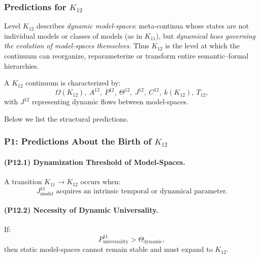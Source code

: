 

\subsubsection{Predictions for $K_{12}$}
\label{sec:predictions-k12}

Level $K_{12}$ describes \emph{dynamic model-spaces}: 
meta-continua whose states are not individual models 
or classes of models (as in $K_{11}$), 
but \emph{dynamical laws governing the evolution of model-spaces themselves}.  
Thus $K_{12}$ is the level at which the continuum 
can reorganize, reparameterize or transform 
entire semantic–formal hierarchies.

A $K_{12}$ continuum is characterized by:
\[
\Omega(K_{12}),\ 
A^{12},\ 
P^{12},\ 
\Theta^{12},\ 
J^{12},\ 
C^{12},\ 
k(K_{12}),\ 
T_{12},
\]
with $J^{12}$ representing dynamic flows between model-spaces.

Below we list the structural predictions.

\subsubsection{P1: Predictions About the Birth of $K_{12}$}

\paragraph{(P12.1) Dynamization Threshold of Model-Spaces.}
A transition $K_{11} \to K_{12}$ occurs when:
\[
J_{\mathrm{model}}^{11} 
\text{ acquires an intrinsic temporal or dynamical parameter}.
\]

\paragraph{(P12.2) Necessity of Dynamic Universality.}
If:
\[
P_{\mathrm{universality}}^{11} > \Theta_{\mathrm{dynamic}},
\]
then static model-spaces cannot remain stable and must expand to $K_{12}$.


